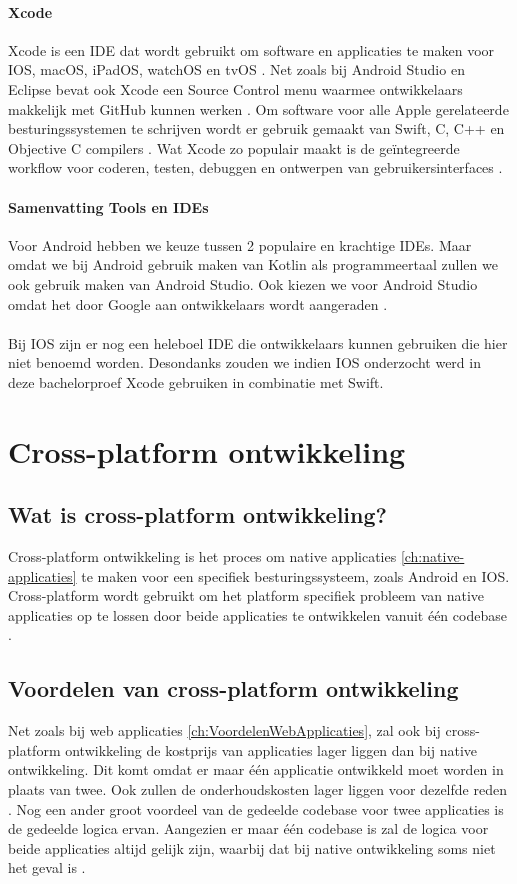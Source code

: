 \paragraph{Xcode}
Xcode is een IDE dat wordt gebruikt om software en applicaties te maken voor IOS, macOS, 
iPadOS, watchOS en tvOS \autocite{jahnavisarora2020}. Net zoals bij Android Studio en 
Eclipse bevat ook Xcode een Source Control menu waarmee ontwikkelaars makkelijk met GitHub 
kunnen werken \autocite{Medewar2022}. Om software voor alle Apple gerelateerde besturingssystemen 
te schrijven wordt er gebruik gemaakt van Swift, C, C++ en Objective C compilers 
\autocite{jahnavisarora2020}. Wat Xcode zo populair maakt is de geïntegreerde workflow 
voor coderen, testen, debuggen en ontwerpen van gebruikersinterfaces \autocite{jahnavisarora2020}.

\paragraph{Samenvatting Tools en IDEs}
Voor Android hebben we keuze tussen 2 populaire en krachtige IDEs. Maar omdat we bij Android 
gebruik maken van Kotlin als programmeertaal zullen we ook gebruik maken van Android Studio. 
Ook kiezen we voor Android Studio omdat het door Google aan ontwikkelaars wordt aangeraden 
\autocite{Medewar2022}.
\\\\
Bij IOS zijn er nog een heleboel IDE die ontwikkelaars kunnen gebruiken die hier niet benoemd 
worden. Desondanks zouden we indien IOS onderzocht werd in deze bachelorproef Xcode gebruiken 
in combinatie met Swift.

\section{Cross-platform ontwikkeling}
\subsection{Wat is cross-platform ontwikkeling?}
Cross-platform ontwikkeling is het proces om native applicaties \ref{ch:native-applicaties} 
te maken voor een specifiek besturingssysteem, zoals Android en IOS. Cross-platform wordt 
gebruikt om het platform specifiek probleem van native applicaties op te lossen door beide 
applicaties te ontwikkelen vanuit één codebase \autocite{Khan2021}.

\subsection{Voordelen van cross-platform ontwikkeling}
Net zoals bij web applicaties \ref{ch:VoordelenWebApplicaties}, zal ook bij cross-platform 
ontwikkeling de kostprijs van applicaties lager liggen dan bij native ontwikkeling. 
Dit komt omdat er maar één applicatie ontwikkeld moet worden in plaats van twee. Ook zullen de 
onderhoudskosten lager liggen voor dezelfde reden \autocite{Terekhov2022}. Nog een ander 
groot voordeel van de gedeelde codebase voor twee applicaties is de gedeelde logica ervan. 
Aangezien er maar één codebase is zal de logica voor beide applicaties altijd gelijk zijn, waarbij 
dat bij native ontwikkeling soms niet het geval is \autocite{Kotlin2023}.

